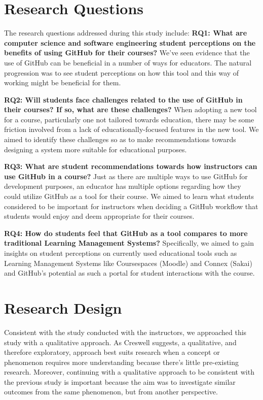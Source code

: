\section{Research Questions}
The research questions addressed during this study include:
\bigskip
\textbf{RQ1: What are computer science and software engineering student perceptions on the benefits of using GitHub for their courses?} We've seen evidence that the use of GitHub can be beneficial in a number of ways for educators. The natural progression was to see student perceptions on how this tool and this way of working might be beneficial for them.

\bigskip
\textbf{RQ2: Will students face challenges related to the use of GitHub in their courses? If so, what are these challenges?} When adopting a new tool for a course, particularly one not tailored towards education, there may be some friction involved from a lack of educationally-focused features in the new tool. We aimed to identify these challenges so as to make recommendations towards designing a system more suitable for educational purposes.

\bigskip
\textbf{RQ3: What are student recommendations towards how instructors can use GitHub in a course?} Just as there are multiple ways to use GitHub for development purposes, an educator has multiple options regarding how they could utilize GitHub as a tool for their course. We aimed to learn what students considered to be important for instructors when deciding a GitHub workflow that students would enjoy and deem appropriate for their courses.

\bigskip
\textbf{RQ4: How do students feel that GitHub as a tool compares to more traditional Learning Management Systems?} Specifically, we aimed to gain insights on student perceptions on currently used educational tools such as Learning Management Systems like Coursespaces (Moodle) and Connex (Sakai) and GitHub's potential as such a portal for student interactions with the course.

\section{Research Design}
Consistent with the study conducted with the instructors, we approached this study with a qualitative approach. As Creswell \cite{creswell2013research} suggests, a qualitative, and therefore exploratory, approach best suits research when a concept or phenomenon requires more understanding because there's little pre-existing research. Moreover, continuing with a qualitative approach to be consistent with the previous study is important because the aim was to investigate similar outcomes from the same phenomenon, but from another perspective. %

